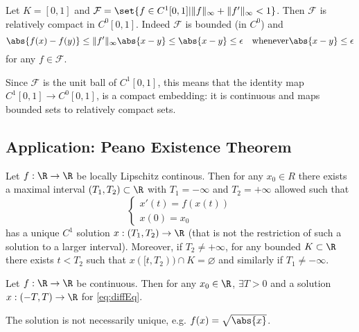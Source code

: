 \documentclass{article}
\renewcommand{\emptyset}{\varnothing}
\begin{document}

\begin{eg}
    Let $K = [0, 1]$ and $\mathcal{F} = \set{f \in C^1[0, 1]|\|f\|_\infty + \|f'\|_\infty < 1}$.
    Then $\mathcal{F}$ is relatively compact in $C^0[0, 1]$.
    Indeed $\mathcal{F}$ is bounded (in $C^0$) and
    \begin{equation*}
        \abs{f(x) - f(y)} \leq \|f'\|_\infty \abs{x - y} \leq \abs{x-y} \leq \epsilon \quad \text{whenever} \abs{x - y} \leq \epsilon
    \end{equation*}
    for any $f \in \mathcal{F}$.

    Since $\mathcal{F}$ is the unit ball of $C^1[0, 1]$, this means that the identity map $C^1[0, 1] \to C^0[0, 1]$, is a compact embedding: it is continuous and maps bounded sets to relatively compact sets.
\end{eg}

\subsection{Application: Peano Existence Theorem}
\begin{thm}
    Let $f: \R \to \R$ be locally Lipschitz continous. Then for any $x_0 \in R$ there exists a maximal interval $(T_1, T_2) \subset \R$ with $T_1 = -\infty$ and $T_2 = +\infty$ allowed such that
    \begin{equation*}
        \begin{cases}
            x'(t) = f(x(t)) \\
            x(0) = x_0
        \end{cases}
        \tag{$*$} \label{eq:diffEq}
    \end{equation*}
    has a unique $C^1$ solution $x:(T_1, T_2) \to \R$ (that is not the restriction of such a solution to a larger interval).
    Moreover, if $T_2 \neq +\infty$, for any bounded $K \subset \R$ there exists $t < T_2$ such that $x([t, T_2)) \cap K = \emptyset$ and similarly if $T_1 \neq -\infty$.
\end{thm}

\begin{thm}[Peano]
    Let $f: \R \to \R$ be continuous. Then for any $x_0 \in \R$, $\exists T > 0$ and a solution $x : (-T, T) \to \R$ for \eqref{eq:diffEq}.
\end{thm}

\begin{remark}
    The solution is not necessarily unique, e.g. $f(x) = \sqrt{\abs{x}}$.
\end{remark}
\end{document}
